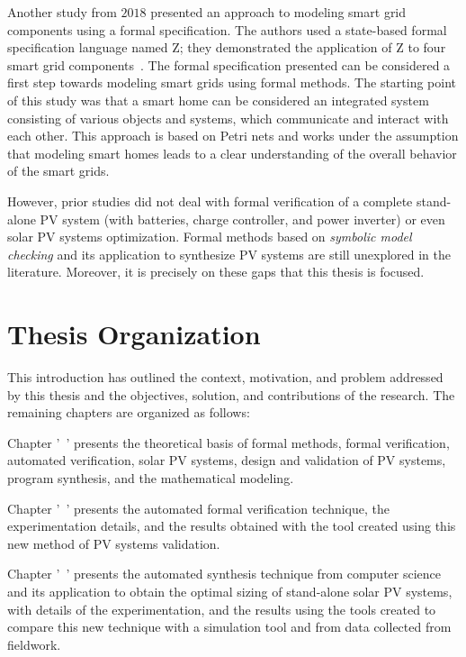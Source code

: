Another study from $2018$ presented an approach to modeling smart grid components using a formal specification. The authors used a state-based formal specification language named Z; they demonstrated the application of Z to four smart grid components~\cite{Akram2018}. The formal specification presented can be considered a first step towards modeling smart grids using formal methods. The starting point of this study was that a smart home can be considered an integrated system consisting of various objects and systems, which communicate and interact with each other. This approach is based on Petri nets and works under the assumption that modeling smart homes leads to a clear understanding of the overall behavior of the smart grids.

However, prior studies did not deal with formal verification of a complete stand-alone PV system (with batteries, charge controller, and power inverter) or even solar PV systems optimization. Formal methods based on \textit{symbolic model checking} and its application to synthesize PV systems are still unexplored in the literature. Moreover, it is precisely on these gaps that this thesis is focused.

\section{Thesis Organization}

This introduction has outlined the context, motivation, and problem addressed by this thesis and the objectives, solution, and contributions of the research. The remaining chapters are organized as follows:

Chapter '~' presents the theoretical basis of formal methods, formal verification, automated verification, solar PV systems, design and validation of PV systems, program synthesis, and the mathematical modeling. 

Chapter '~' presents the automated formal verification technique, the experimentation details, and the results obtained with the tool created using this new method of PV systems validation. 

Chapter '~' presents the automated synthesis technique from computer science and its application to obtain the optimal sizing of stand-alone solar PV systems, with details of the experimentation, and the results using the tools created to compare this new technique with a  simulation tool and from data collected from fieldwork. 

